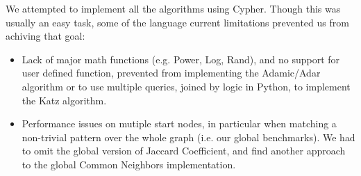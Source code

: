 We attempted to implement all the algorithms using Cypher. Though this was 
usually an easy task, some of the language current limitations prevented us 
from achiving that goal:
\begin{itemize}
	\item Lack of major math functions (e.g. Power, Log, Rand), and no support 
		for user defined function, prevented from implementing the Adamic/Adar 
		algorithm or to use multiple queries, joined by logic in Python, 
		to implement the Katz algorithm.
	\item Performance issues on mutiple start nodes, in particular when matching
		a non-trivial pattern over the whole graph (i.e. our global benchmarks).
		We had to omit the global version of Jaccard Coefficient, and find another
		approach to the global Common Neighbors implementation.
\end{itemize}

